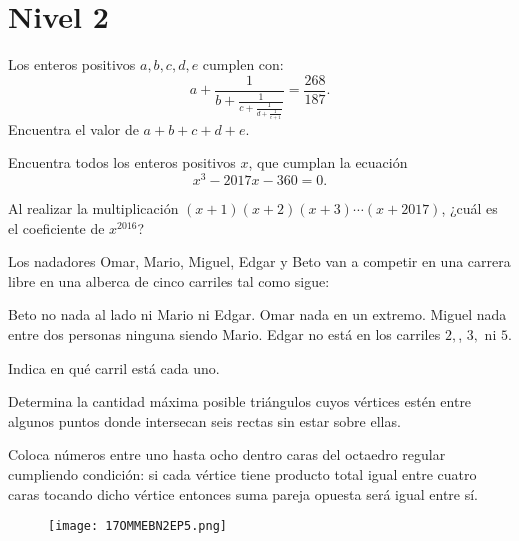 \section{Nivel 2}

\begin{problem}[OMMEB 2017]
    Los enteros positivos \(a, b, c, d, e\) cumplen con:
    \[
    a + \frac{1}{b + \frac{1}{c + \frac{1}{d + \frac{1}{e + 1}}}} = \frac{268}{187}.
    \]
    Encuentra el valor de \(a + b + c + d + e\).
\end{problem}

\begin{problem}[OMMEB 2017]
    Encuentra todos los enteros positivos \(x\), 
    que cumplan la ecuación 
    \[
    x^3 - 2017x - 360 = 0.
    \]
\end{problem}

\begin{problem}[OMMEB 2017]
    Al realizar la multiplicación \((x + 1)(x + 2)(x + 3) \cdots (x + 2017)\), 
    ¿cuál es el coeficiente de \(x^{2016}\)?
\end{problem}

\begin{problem}[OMMEB 2017]
    Los nadadores Omar, Mario, Miguel, Edgar y Beto van a 
    competir en una carrera libre en una alberca de cinco 
    carriles tal como sigue:
    \begin{enumerate}
        \ii Beto no nada al lado ni Mario ni Edgar.
        \ii Omar nada en un extremo.
        \ii Miguel nada entre dos personas ninguna siendo Mario.
        \ii Edgar no está en los carriles \(2,\), \(3,\) ni \(5.\)
    \end{enumerate}
    Indica en qué carril está cada uno.
\end{problem}

\begin{problem}[OMMEB 2017]
    Determina la cantidad máxima posible triángulos cuyos 
    vértices estén entre algunos puntos donde intersecan seis 
    rectas sin estar sobre ellas.
\end{problem}

\begin{problem}[OMMEB 2017]
    Coloca números entre uno hasta ocho dentro caras del 
    octaedro regular cumpliendo condición: si cada vértice 
    tiene producto total igual entre cuatro caras tocando dicho 
    vértice entonces suma pareja opuesta será igual entre sí.
\end{problem}

\begin{figure}[h]
    \centering
    \texttt{[image: 17OMMEBN2EP5.png]}
\end{figure}

